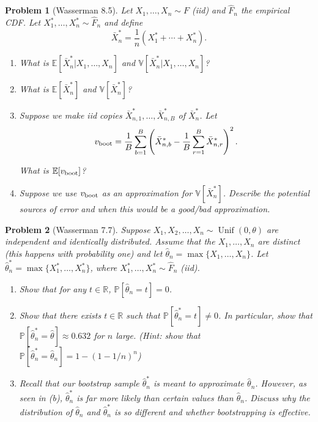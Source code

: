 \documentclass{article}
\newtheorem{problem}{Problem}
\newcommand{\PP}{\mathbb{P}}
\newcommand{\EE}{\mathbb{E}}
\newcommand{\VV}{\mathbb{V}}
\begin{document}
\begin{problem}[Wasserman 8.5]
    Let $X_1, \ldots, X_n \sim F$ (iid) and $\hat{F}_n$ the empirical CDF.
    Let $X_1^*, \ldots, X_n^* \sim \hat{F}_n$ and define
    \begin{equation*}
        \bar{X}_n^* = \frac{1}{n} (X_1^* + \cdots + X_n^*).
    \end{equation*}
    
    \begin{enumerate}[label=(\alph*),topsep=0pt]
        \item What is $\EE[\bar{X}_n^*|X_1, \ldots, X_n]$ and $\VV[\bar{X}_n^*|X_1, \ldots, X_n]$?
        \item What is $\EE[\bar{X}_n^*]$ and $\VV[\bar{X}_n^*]$?
        \item Suppose we make iid copies $\bar{X}_{n,1}^*, \ldots, \bar{X}_{n,B}^*$ of $\bar{X}_n^*$.
            Let
            \begin{equation*}
                v_{\textup{boot}} = \frac{1}{B} \sum_{b=1}^{B} \left( \bar{X}_{n,b}^* - \frac{1}{B} \sum_{r=1}^{B} \bar{X}_{n,r}^* \right)^2.
            \end{equation*}

            What is $\EE[v_{\textup{boot}}]$? 

        \item Suppose we use $v_{\textup{boot}}$ as an approximation for $\VV[\bar{X}_n^*]$.
            Describe the potential sources of error and when this would be a good/bad approximation.

    \end{enumerate}
\end{problem}


\begin{problem}[Wasserman 7.7]
    Suppose $X_1, X_2, \ldots, X_n \sim \operatorname{Unif}(0,\theta)$ are independent and identically distributed. 
    Assume that the $X_1, \ldots, X_n$ are distinct (this happens with probability one) and let $\hat{\theta}_n = \max\{X_1, \ldots, X_n\}$.
    Let $\hat{\theta}_n^* = \max\{X_1^*, \ldots, X_n^*\}$, where $X_1^*, \ldots, X_n^* \sim \hat{F}_n$ (iid).


    \begin{enumerate}[label=(\alph*),topsep=0pt]
        \item Show that for any $t\in\mathbb{R}$, $\PP[\hat{\theta}_n = t] = 0$. 
        \item Show that there exists $t\in \mathbb{R}$ such that $\PP[\hat{\theta}_n^* = t] \neq 0 $. In particular, show that $\PP[\hat{\theta}_n^* = \hat{\theta}] \approx 0.632$ for $n$ large. (Hint: show that $\PP[\hat{\theta}_n^* = \hat{\theta}_n] = 1-(1-1/n)^n$)
        \item Recall that our bootstrap sample $\hat{\theta}_n^*$ is meant to approximate $\hat{\theta}_n$. 
            However, as seen in (b), $\hat{\theta}_n^*$ is far more likely than certain values than $\hat{\theta}_n$.
        Discuss why the distribution of $\hat{\theta}_n$ and $\hat{\theta}_n^*$ is so different and whether bootstrapping is effective.
    \end{enumerate}
\end{problem}
\end{document}
